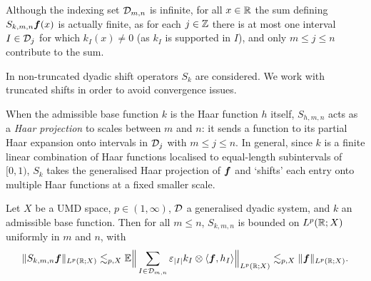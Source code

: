 Although the indexing set $\mathcal{D}_{m,n}$ is infinite, for all $x \in \mathbb{R}$ the sum defining $S_{k,m,n}\bm{f}(x)$ is actually finite, as for each $j \in \mathbb{Z}$ there is at most one interval $I \in \mathcal{D}_{j}$ for which $k_{I}(x) \neq 0$ (as $k_{I}$ is supported in $I$), and only $m \leq j \leq n$ contribute to the sum.

\begin{rmk}
  In \cite{HNVW16} non-truncated dyadic shift operators $S_{k}$ are considered.
  We work with truncated shifts in order to avoid convergence issues.
\end{rmk}

When the admissible base function $k$ is the Haar function $h$ itself, $S_{h, m,n}$ acts as a \emph{Haar projection} to scales between $m$ and $n$: it sends a function to its partial Haar expansion onto intervals in $\mathcal{D}_{j}$ with $m \leq j \leq n$.
In general, since $k$ is a finite linear combination of Haar functions localised to equal-length subintervals of $[0,1)$, $S_{k}$ takes the generalised Haar projection of $\bm{f}$ and `shifts' each entry onto multiple Haar functions at a fixed smaller scale.

\begin{thm}\label{eq:shift-boundedness}
  Let $X$ be a UMD space, $p \in (1,\infty)$, $\mathcal{D}$ a generalised dyadic system, and $k$ an admissible base function.
  Then for all $m \leq n$, $S_{k,m,n}$ is bounded on $L^{p}(\mathbb{R};X)$ uniformly in $m$ and $n$,
  with
  \begin{equation*}
    \|S_{k,m,n} \bm{f}\|_{L^p(\mathbb{R};X)} \lesssim_{p,X} \mathbb{E} \Big\| \sum_{I \in \mathcal{D}_{m,n}} \varepsilon_{|I|} k_{I} \otimes \langle \bm{f}, h_{I} \rangle \Big\|_{L^p(\mathbb{R};X)} \lesssim_{p,X} \|\bm{f}\|_{L^p(\mathbb{R};X)}.
  \end{equation*}
\end{thm}

